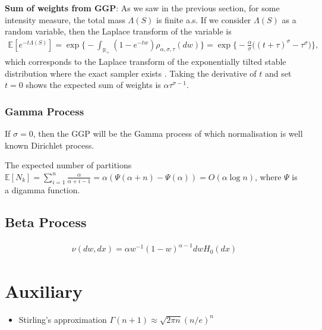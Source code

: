 \documentclass{article}
\begin{document}
\textbf{Sum of weights from GGP}: As we saw in the previous section, for some intensity measure, the total mass $\Lambda(S)$ is finite a.s. If we consider $\Lambda(S)$ as a random variable, then the Laplace transform of the variable is
\begin{align}
\mathbb{E}[e^{-t\Lambda(S)}] = \exp\bigg\{-\int_{\mathbb{R}_+} (1- e^{-tw}) \rho_{\alpha, \sigma, \tau}(dw) \bigg\} = \exp\bigg\{-\frac{\alpha}{\sigma}\big((t+\tau)^\sigma - \tau^\sigma\big)\bigg\},
\end{align}
which corresponds to the Laplace transform of the exponentially tilted stable distribution where the exact sampler exists \citep{devroye2009random,hofert2011sampling}. Taking the derivative of $t$ and set $t=0$ shows the expected sum of weights is $\alpha \tau^{\sigma-1}$.

\subsubsection{Gamma Process}
If $\sigma = 0$, then the GGP will be the Gamma process of which normalisation is well known Dirichlet process.

The expected number of partitions $\mathbb{E}[N_k] = \sum_{i=1}^{n} \frac{\alpha}{\alpha + i - 1} = \alpha (\Psi(\alpha + n) - \Psi(\alpha)) = O(\alpha \log n)$, where $\Psi$ is a digamma function.

\subsection{Beta Process}
\begin{align}
\nu(dw, dx) = \alpha w^{-1}(1-w)^{\alpha-1} dw H_0(dx)
\end{align}

\section{Auxiliary}
\begin{itemize}
\item Stirling's approximation $\Gamma(n+1) \approx \sqrt{2\pi n}(n/e)^{n}$
\end{itemize}




\end{document}
